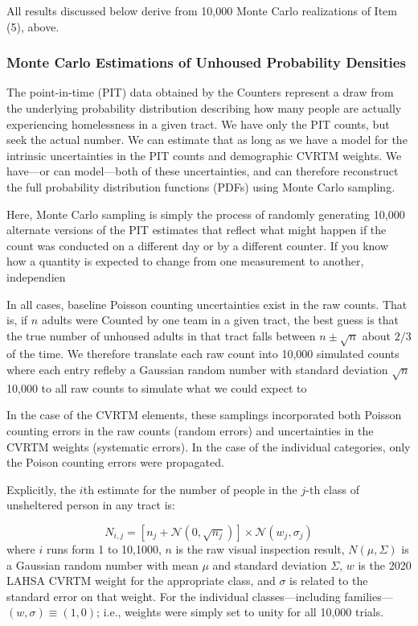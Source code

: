 \documentclass[11pt,twocolumn]{article}
\begin{document}
All results discussed below derive from 10,000 Monte Carlo realizations of Item (5), above.


\subsubsection{Monte Carlo Estimations of Unhoused Probability Densities}
\label{sec:mc}

The point-in-time (PIT) data obtained by the Counters represent a draw from the underlying probability
distribution describing how many people are actually experiencing homelessness in a given tract. We have
only the PIT counts, but seek the actual number. We can estimate that as long as we have a model for
the intrinsic uncertainties in the PIT counts and demographic CVRTM weights. We have---or can 
model---both of these uncertainties, and can therefore reconstruct the full probability distribution 
functions (PDFs) using Monte Carlo sampling.

Here, Monte Carlo sampling is simply the process of randomly generating 10,000 alternate versions of
the PIT estimates that reflect what might happen if the count was conducted on a different day or by
a different counter. If you know how a quantity is expected to change from one measurement to another,
independien 

In all cases, baseline Poisson counting uncertainties exist in the raw counts. That is, if $n$ adults were 
Counted by one team in a given tract, the best guess is that the true number of unhoused adults 
in that tract falls between $n\pm\sqrt{n}$ about $2/3$ of the time. We therefore translate each raw 
count into 10,000 simulated counts where each entry refleby a Gaussian random number with standard deviation $\sqrt{n}$ 10,000
to all raw counts to simulate what we could expect to 

In the case of the CVRTM elements, these samplings incorporated both Poisson counting 
errors in the raw counts (random errors) and uncertainties in the CVRTM weights (systematic errors). 
In the case of the individual categories, only the Poison counting errors were propagated.

Explicitly, the $i$th estimate for the number of people in the $j$-th class of unsheltered person in any
tract is:

\begin{equation}\label{eq:monte}
	N_{i,j} = \left[n_{j} + \mathcal{N}(0,\sqrt{n_{j}})\right]\times\mathcal{N}(w_{j}, \sigma_{j})
\end{equation}
where $i$ runs form 1 to 10,1000, $n$ is the raw visual inspection result, $N(\mu,\Sigma)$ is a 
Gaussian random number with mean $\mu$ and standard deviation $\Sigma$, $w$ is the 2020 
LAHSA CVRTM weight for the appropriate class, and $\sigma$ is related to the standard error on that 
weight. For the individual classes---including families---$(w,\sigma)\equiv(1,0)$; i.e., weights were simply 
set to unity for all 10,000 trials.
\end{document}
